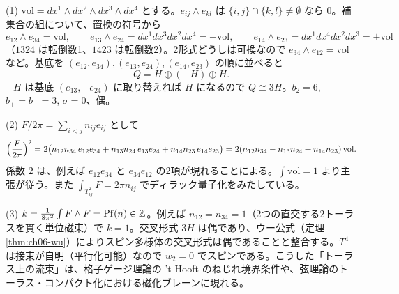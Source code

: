 \begin{solution}
(1) $\mathrm{vol}=dx^1\wedge dx^2\wedge dx^3\wedge dx^4$ とする。$e_{ij}\wedge e_{kl}$ は $\{i,j\}\cap\{k,l\}\neq\emptyset$ なら $0$。補集合の組について、置換の符号から
\[
e_{12}\wedge e_{34}=\mathrm{vol},\qquad e_{13}\wedge e_{24}=dx^1dx^3dx^2dx^4=-\mathrm{vol},\qquad e_{14}\wedge e_{23}=dx^1dx^4dx^2dx^3=+\mathrm{vol}
\]
（$1324$ は転倒数1、$1423$ は転倒数2）。2形式どうしは可換なので $e_{34}\wedge e_{12}=\mathrm{vol}$ など。基底を $(e_{12},e_{34}),(e_{13},e_{24}),(e_{14},e_{23})$ の順に並べると
\[
Q=H\oplus(-H)\oplus H .
\]
$-H$ は基底 $(e_{13},-e_{24})$ に取り替えれば $H$ になるので $Q\cong3H$。$b_2=6$, $b_+=b_-=3$, $\sigma=0$、偶。

(2) $F/2\pi=\sum_{i<j}n_{ij}e_{ij}$ として
\[
\Bigl(\frac{F}{2\pi}\Bigr)^2=2\bigl(n_{12}n_{34}\,e_{12}e_{34}+n_{13}n_{24}\,e_{13}e_{24}+n_{14}n_{23}\,e_{14}e_{23}\bigr)=2(n_{12}n_{34}-n_{13}n_{24}+n_{14}n_{23})\,\mathrm{vol}.
\]
係数 $2$ は、例えば $e_{12}e_{34}$ と $e_{34}e_{12}$ の2項が現れることによる。$\int\mathrm{vol}=1$ より主張が従う。また $\int_{T^2_{ij}}F=2\pi n_{ij}$ でディラック量子化をみたしている。

(3) $k=\frac{1}{8\pi^2}\int F\wedge F=\operatorname{Pf}(n)\in\mathbb{Z}$。例えば $n_{12}=n_{34}=1$（2つの直交する2トーラスを貫く単位磁束）で $k=1$。交叉形式 $3H$ は偶であり、ウー公式（定理 \ref{thm:ch06-wu}）によりスピン多様体の交叉形式は偶であることと整合する。$T^4$ は接束が自明（平行化可能）なので $w_2=0$ でスピンである。こうした「トーラス上の流束」は、格子ゲージ理論の 't Hooft のねじれ境界条件や、弦理論のトーラス・コンパクト化における磁化ブレーンに現れる。
\end{solution}

